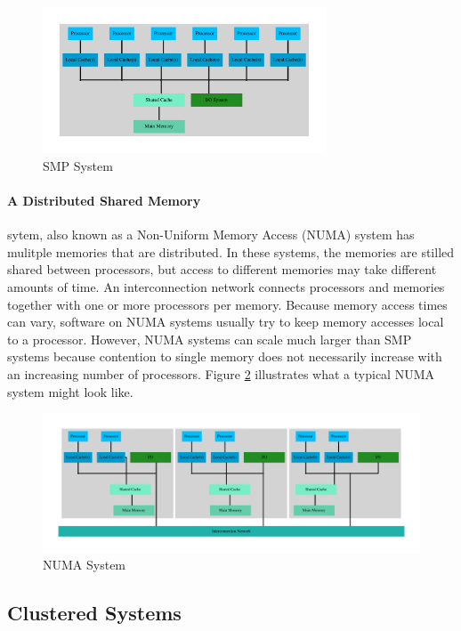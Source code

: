 \documentclass[11pt]{book}
\begin{document}
\begin{figure}[H]
    \centering
    \includegraphics[width=0.75\textwidth]{figs/graphviz/smp.pdf}
    \caption{SMP System}\label{smp}
\end{figure}

\paragraph{A Distributed Shared Memory} sytem, also known as a Non-Uniform Memory Access
(NUMA) system has mulitple memories that are distributed. In these systems, the memories are
stilled shared between processors, but access to different memories may take different amounts
of time. An interconnection network connects processors and memories together with one or
more processors per memory. Because memory access times can vary, software on NUMA systems
usually try to keep memory accesses local to a processor. However, NUMA systems can scale
much larger than SMP systems because contention to single memory does not necessarily increase
with an increasing number of processors. Figure \ref{distributed} illustrates what a typical
NUMA system might look like.

\begin{figure}[H]
    \centering
    \includegraphics[width=\textwidth]{figs/graphviz/distributed.pdf}
    \caption{NUMA System}\label{distributed}
\end{figure}

\subsection{Clustered Systems}
\end{document}
